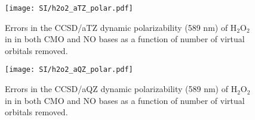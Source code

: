 \begin{figure}
  \centering
  \texttt{[image: SI/h2o2\_aTZ\_polar.pdf]}
  \caption{Errors in the CCSD/aTZ dynamic polarizability (589 nm) of
H$_2$O$_2$ in in both CMO and NO bases as a function of number of virtual orbitals removed.}
   \label{fig:h2o2_aTZ_polar}
\end{figure}
\begin{figure}
  \centering
  \texttt{[image: SI/h2o2\_aQZ\_polar.pdf]}
  \caption{Errors in the CCSD/aQZ dynamic polarizability (589 nm) of
H$_2$O$_2$ in in both CMO and NO bases as a function of number of virtual orbitals removed.}
   \label{fig:h2o2_aQZ_polar}
\end{figure}
